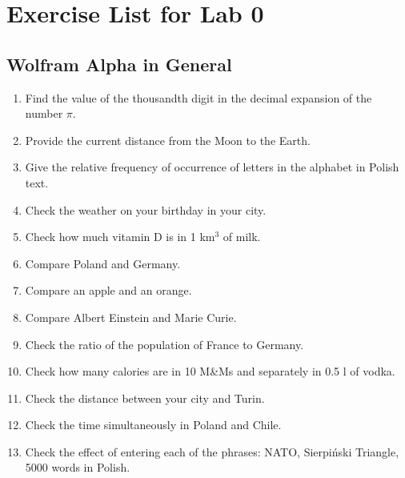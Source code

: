 \documentclass[11pt]{article}
\begin{document}
\section*{Exercise List for Lab 0}

\subsection*{Wolfram Alpha in General}
\begin{enumerate}
    \item Find the value of the thousandth digit in the decimal expansion of the number $\pi$.
    \item Provide the current distance from the Moon to the Earth.
    \item Give the relative frequency of occurrence of letters in the alphabet in Polish text.
    \item Check the weather on your birthday in your city.
    \item Check how much vitamin D is in 1 km$^3$ of milk.
    \item Compare Poland and Germany.
    \item Compare an apple and an orange.
    \item Compare Albert Einstein and Marie Curie.
    \item Check the ratio of the population of France to Germany.
    \item Check how many calories are in 10 M\&Ms and separately in 0.5 l of vodka.
    \item Check the distance between your city and Turin.
    \item Check the time simultaneously in Poland and Chile.
    \item Check the effect of entering each of the phrases: NATO, Sierpiński Triangle, 5000 words in Polish.
\end{enumerate}
\end{document}
